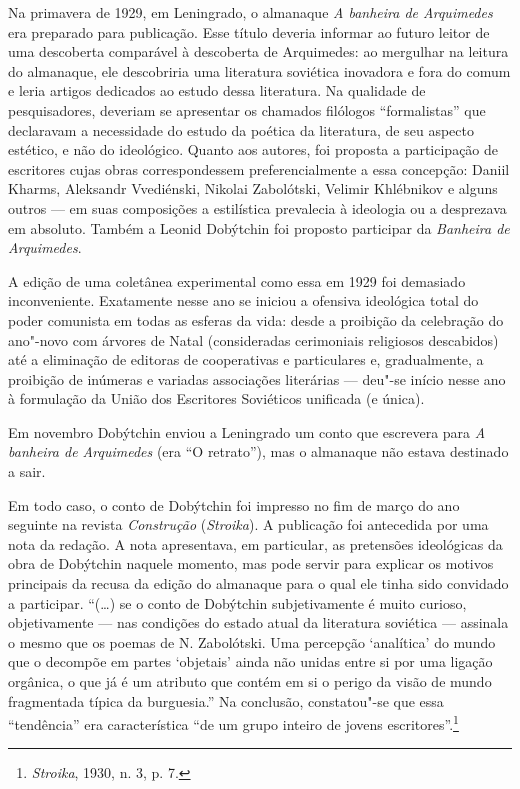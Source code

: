 \movetooddpage
\pagebreak
\begin{center}
{}
\end{center}
\label{prefacio}


Na primavera de 1929, em Leningrado, o almanaque \emph{A banheira de
Arquimedes} era preparado para publicação. Esse título deveria informar
ao futuro leitor de uma descoberta comparável à descoberta de
Arquimedes: ao mergulhar na leitura do almanaque, ele descobriria uma
literatura soviética inovadora e fora do comum e leria artigos dedicados
ao estudo dessa literatura. Na qualidade de pesquisadores, deveriam se
apresentar os chamados filólogos ``formalistas'' que declaravam a
necessidade do estudo da poética da literatura, de seu aspecto estético,
e não do ideológico. Quanto aos autores, foi proposta a participação de
escritores cujas obras correspondessem preferencialmente a essa
concepção: Daniil Kharms, Aleksandr Vvediénski, Nikolai Zabolótski,
Velimir Khlébnikov e alguns outros --- em suas composições a estilística
prevalecia à ideologia ou a desprezava em absoluto. Também a Leonid
Dobýtchin foi proposto participar da \emph{Banheira de Arquimedes}.

A edição de uma coletânea experimental como essa em 1929 foi demasiado
inconveniente. Exatamente nesse ano se iniciou a ofensiva ideológica
total do poder comunista em todas as esferas da vida: desde a proibição
da celebração do ano"-novo com árvores de Natal (consideradas cerimoniais
religiosos descabidos) até a eliminação de editoras de cooperativas e
particulares e, gradualmente, a proibição de inúmeras e variadas
associações literárias --- deu"-se início nesse ano à formulação da
União dos Escritores Soviéticos unificada (e única).

Em novembro Dobýtchin enviou a Leningrado um conto que escrevera para
\emph{A banheira de Arquimedes} (era ``O retrato''), mas o almanaque não
estava destinado a sair.

Em todo caso, o conto de Dobýtchin foi impresso no fim de março do ano
seguinte na revista \emph{Construção} (\emph{Stroika}). A publicação foi
antecedida por uma nota da redação. A nota apresentava, em particular,
as pretensões ideológicas da obra de Dobýtchin naquele momento, mas pode
servir para explicar os motivos principais da recusa da edição do
almanaque para o qual ele tinha sido convidado a participar. ``(\ldots{}) se
o conto de Dobýtchin subjetivamente é muito curioso, objetivamente ---
nas condições do estado atual da literatura soviética --- assinala o
mesmo que os poemas de N. Zabolótski. Uma percepção `analítica' do
mundo que o decompõe em partes `objetais' ainda não unidas entre si
por uma ligação orgânica, o que já é um atributo que contém em si o
perigo da visão de mundo fragmentada típica da burguesia.'' Na
conclusão, constatou"-se que essa ``tendência'' era característica ``de
um grupo inteiro de jovens escritores''.\footnote{\emph{Stroika}, 1930,
  n. 3, p. 7.} %

